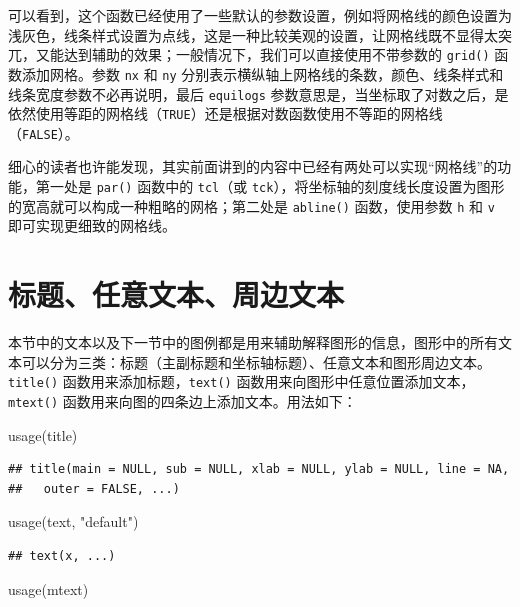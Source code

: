 \documentclass[
  b5paper,
  UTF8,twoside]{book}
\newenvironment{Shaded}{\begin{snugshade}}{\end{snugshade}}
\newcommand{\FunctionTok}[1]{\textcolor[rgb]{0.00,0.00,0.00}{#1}}
\newcommand{\NormalTok}[1]{#1}
\newcommand{\StringTok}[1]{\textcolor[rgb]{0.31,0.60,0.02}{#1}}
\begin{document}
可以看到，这个函数已经使用了一些默认的参数设置，例如将网格线的颜色设置为浅灰色，线条样式设置为点线，这是一种比较美观的设置，让网格线既不显得太突兀，又能达到辅助的效果；一般情况下，我们可以直接使用不带参数的 \texttt{grid()} 函数添加网格。参数 \texttt{nx} 和 \texttt{ny} 分别表示横纵轴上网格线的条数，颜色、线条样式和线条宽度参数不必再说明，最后 \texttt{equilogs} 参数意思是，当坐标取了对数之后，是依然使用等距的网格线（\texttt{TRUE}）还是根据对数函数使用不等距的网格线（\texttt{FALSE}）。

细心的读者也许能发现，其实前面讲到的内容中已经有两处可以实现``网格线''的功能，第一处是 \texttt{par()} 函数中的 \texttt{tcl}（或 \texttt{tck}），将坐标轴的刻度线长度设置为图形的宽高就可以构成一种粗略的网格；第二处是 \texttt{abline()} 函数，使用参数 \texttt{h} 和 \texttt{v} 即可实现更细致的网格线。

\hypertarget{sec:text}{%
\section{标题、任意文本、周边文本}\label{sec:text}}

本节中的文本以及下一节中的图例都是用来辅助解释图形的信息，图形中的所有文本可以分为三类：标题（主副标题和坐标轴标题）、任意文本和图形周边文本。\texttt{title()} 函数用来添加标题，\texttt{text()} 函数用来向图形中任意位置添加文本，\texttt{mtext()} 函数用来向图的四条边上添加文本。用法如下：

\begin{Shaded}
\begin{Highlighting}[]
\FunctionTok{usage}\NormalTok{(title)}
\end{Highlighting}
\end{Shaded}

\begin{verbatim}
## title(main = NULL, sub = NULL, xlab = NULL, ylab = NULL, line = NA,
##   outer = FALSE, ...)
\end{verbatim}

\begin{Shaded}
\begin{Highlighting}[]
\FunctionTok{usage}\NormalTok{(text, }\StringTok{"default"}\NormalTok{)}
\end{Highlighting}
\end{Shaded}

\begin{verbatim}
## text(x, ...)
\end{verbatim}

\begin{Shaded}
\begin{Highlighting}[]
\FunctionTok{usage}\NormalTok{(mtext)}
\end{Highlighting}
\end{Shaded}
\end{document}
